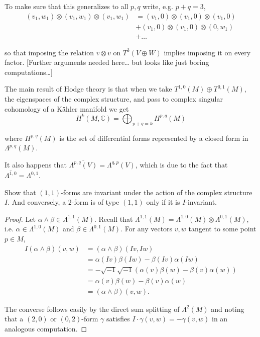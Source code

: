 \documentclass{book}
\begin{document}
To make sure that this generalizes to all
$p,q$
write, e.g. $p+q=3$,
$$
\begin{aligned}
(v_1,w_1)\otimes(v_1,w_1)\otimes(v_1,w_1)
&=(v_1,0)\otimes(v_1,0)\otimes(v_1,0)\\
&+(v_1,0)\otimes(v_1,0)\otimes(0,w_1)\\
&+…
\end{aligned}
$$

\noindent
so that imposing the relation $v \otimes v$
on $T^3(V \oplus W)$
implies imposing it on every factor.
[Further arguments needed here… but looks
like just boring computations…]

\medskip\noindent
The main result of Hodge theory is that
when we take $T^{1,0}(M)\oplus T^{0,1}(M)$,
the eigenspaces of the complex structure,
and pass to complex singular cohomology of a
Kähler manifold we get
\begin{equation}
\label{equation-hodge-theorem}
H^{k}(M,\mathbb{C})
=\bigoplus_{p+q=k}H^{p,q}(M)
\end{equation}

\noindent
where $H^{p,q}(M)$ is the set of differential
forms
represented by a closed form in
$\Lambda^{p,q}(M)$.

\medskip\noindent
It also happens that
$\overline{\Lambda^{p,q}(V)}=\Lambda^{q,p}(V)
$,
which is due to the fact that
$\overline{\Lambda^{1,0}}=\Lambda^{0,1}$.


\begin{exercise}
\label{exercise-1,1-forms-are-i-invariant}
Show that $(1,1)$-forms are invariant under
the action of
the complex structure $I$.
And conversely, a 2-form is of type $(1,1)$
only if it is $I$-invariant.
\end{exercise}

\begin{proof}
Let $\alpha\wedge\beta \in \Lambda^{1,1}(M)$.
Recall that
$\Lambda^{1,1}(M)=\Lambda^{1,0}(M)
\otimes\Lambda^{0,1}(M)$,
i.e. $\alpha \in \Lambda^{1,0}(M)$ and
$\beta \in \Lambda^{0,1}(M)$.
For any vectors $v,w$ tangent to some point
$p \in M$,
$$
\begin{aligned}
I(\alpha\wedge\beta)(v,w)
&=(\alpha\wedge\beta)(Iv,Iw)\\
&=\alpha(Iv)\beta(Iw)-\beta(Iv)\alpha(Iw)\\
&=-\sqrt{-1}\sqrt{-1}(\alpha(v)\beta(w)-
\beta(v)\alpha(w))\\
&=\alpha(v)\beta(w)-\beta(v)\alpha(w)\\
&=(\alpha\wedge\beta)(v,w).
\end{aligned}
$$

\noindent
The converse follows easily by the direct sum
splitting of $\Lambda^2(M)$ and noting that
a $(2,0)$ or $(0,2)$-form $\gamma$
satisfies $I\cdot\gamma(v,w)=-\gamma(v,w)$
in an analogous computation.
\end{proof}
\end{document}
